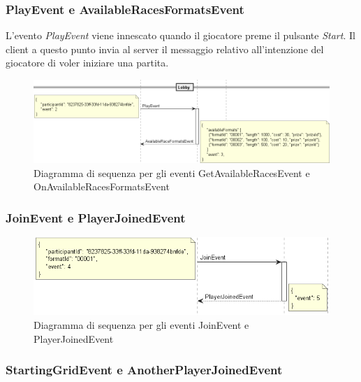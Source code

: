         \subsubsection{PlayEvent e AvailableRacesFormatsEvent}
        L'evento \textit{PlayEvent} viene innescato quando il giocatore preme il pulsante \textit{Start}.
        Il client a questo punto invia al server il messaggio relativo all'intenzione del giocatore di voler iniziare una partita. 

        \begin{figure}[!ht]
            \centering
            \includegraphics[width=14.5cm]{figure/RacesFormats.png}
            \caption{Diagramma di sequenza per gli eventi GetAvailableRacesEvent e OnAvailableRacesFormatsEvent}
            \label{img:PlayEvent}
        \end{figure}

        \subsubsection{JoinEvent e PlayerJoinedEvent}

        \begin{figure}[!ht]
            \centering
            \includegraphics[width=13cm]{figure/JoinEvent.png}
            \caption{Diagramma di sequenza per gli eventi JoinEvent e PlayerJoinedEvent}
        \end{figure}

        \subsubsection{StartingGridEvent e AnotherPlayerJoinedEvent}

